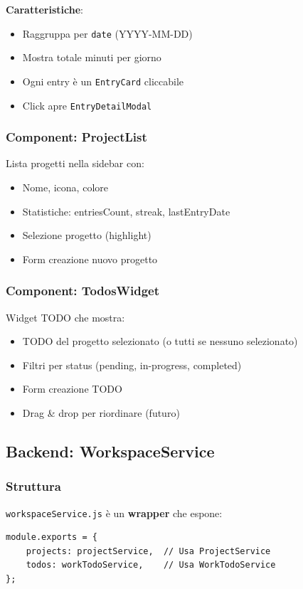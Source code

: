 \documentclass[11pt,a4paper]{article}
\begin{document}
\textbf{Caratteristiche}:
\begin{itemize}
    \item Raggruppa per \texttt{date} (YYYY-MM-DD)
    \item Mostra totale minuti per giorno
    \item Ogni entry è un \texttt{EntryCard} cliccabile
    \item Click apre \texttt{EntryDetailModal}
\end{itemize}

\subsubsection{Component: ProjectList}

Lista progetti nella sidebar con:
\begin{itemize}
    \item Nome, icona, colore
    \item Statistiche: entriesCount, streak, lastEntryDate
    \item Selezione progetto (highlight)
    \item Form creazione nuovo progetto
\end{itemize}

\subsubsection{Component: TodosWidget}

Widget TODO che mostra:
\begin{itemize}
    \item TODO del progetto selezionato (o tutti se nessuno selezionato)
    \item Filtri per status (pending, in-progress, completed)
    \item Form creazione TODO
    \item Drag \& drop per riordinare (futuro)
\end{itemize}

\subsection{Backend: WorkspaceService}

\subsubsection{Struttura}

\texttt{workspaceService.js} è un \textbf{wrapper} che espone:
\begin{lstlisting}
module.exports = {
    projects: projectService,  // Usa ProjectService
    todos: workTodoService,    // Usa WorkTodoService
};
\end{lstlisting}
\end{document}
